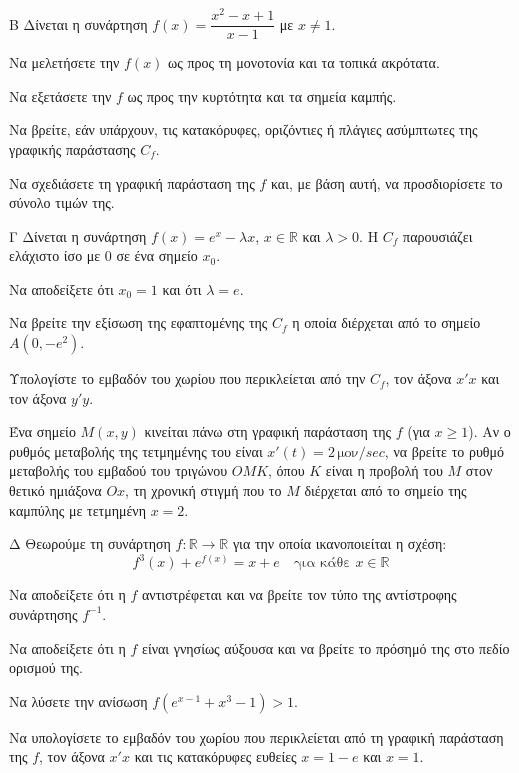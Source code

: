\begin{thema}{Β}
Δίνεται η συνάρτηση $f(x) = \dfrac{x^2 - x + 1}{x - 1}$ με $x \ne 1$.
\begin{erwthma}
    \item Να μελετήσετε την $f(x)$ ως προς τη μονοτονία και τα τοπικά ακρότατα. 
    \item Να εξετάσετε την $f$ ως προς την κυρτότητα και τα σημεία καμπής. 
    \item Να βρείτε, εάν υπάρχουν, τις κατακόρυφες, οριζόντιες ή πλάγιες ασύμπτωτες της γραφικής παράστασης $C_f$. 

    \item Να σχεδιάσετε τη γραφική παράσταση της $f$ και, με βάση αυτή, να προσδιορίσετε το σύνολο τιμών της. 
\end{erwthma}
\end{thema}
\begin{thema}{Γ}
Δίνεται η συνάρτηση $f(x) = e^x - \lambda x$, $x \in \mathbb{R}$ και $\lambda > 0$. Η $C_f$ παρουσιάζει ελάχιστο ίσο με $0$ σε ένα σημείο $x_0$.
\begin{erwthma}
    \item Να αποδείξετε ότι $x_0 = 1$ και ότι $\lambda = e$. 
    \item Να βρείτε την εξίσωση της εφαπτομένης της $C_f$ η οποία διέρχεται από το σημείο $A(0, -e^2)$.

    \item Υπολογίστε το εμβαδόν του χωρίου που περικλείεται από την $C_f$, τον άξονα $x'x$ και τον άξονα $y'y$. 

    \item Ένα σημείο $M(x, y)$ κινείται πάνω στη γραφική παράσταση της $f$ (για $x \ge 1$). Αν ο ρυθμός μεταβολής της τετμημένης του είναι $x'(t) = 2 \, \text{μον}/\si{sec}$, να βρείτε το ρυθμό μεταβολής του εμβαδού του τριγώνου $O M K$, όπου $K$ είναι η προβολή του $M$ στον θετικό ημιάξονα $Ox$, τη χρονική στιγμή που το $M$ διέρχεται από το σημείο της καμπύλης με τετμημένη $x=2$. 
\end{erwthma}
\end{thema}
\begin{thema}{Δ}
Θεωρούμε τη συνάρτηση $f: \mathbb{R} \to \mathbb{R}$ για την οποία ικανοποιείται η σχέση:
\[ f^3(x) + e^{f(x)} = x + e \quad \text{για κάθε } x \in \mathbb{R} \]
\begin{erwthma}
    \item Να αποδείξετε ότι η $f$ αντιστρέφεται και να βρείτε τον τύπο της αντίστροφης συνάρτησης $f^{-1}$. 
    \item Να αποδείξετε ότι η $f$ είναι γνησίως αύξουσα και να βρείτε το πρόσημό της στο πεδίο ορισμού της. 
    \item Να λύσετε την ανίσωση $f(e^{x-1} + x^3 - 1) > 1$. 
    \item Να υπολογίσετε το εμβαδόν του χωρίου που περικλείεται από τη γραφική παράσταση της $f$, τον άξονα $x'x$ και τις κατακόρυφες ευθείες $x = 1 - e$ και $x = 1$. 
\end{erwthma}
\end{thema}
\newpage
